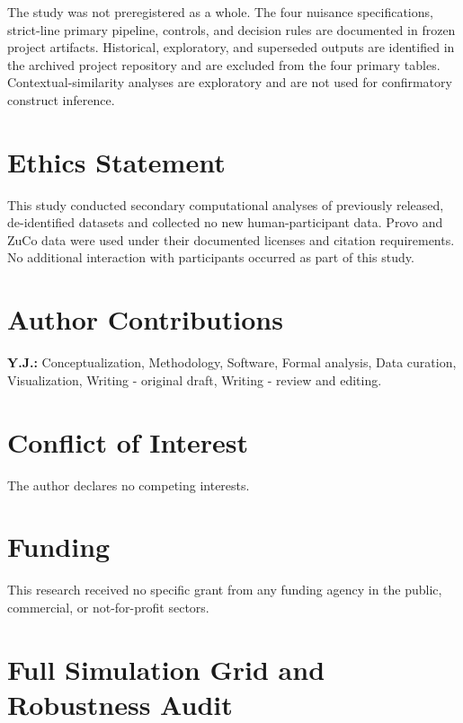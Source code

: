 \documentclass[11pt]{article}
\begin{document}
The study was not preregistered as a whole. The four nuisance specifications, strict-line primary pipeline, controls, and decision rules are documented in frozen project artifacts. Historical, exploratory, and superseded outputs are identified in the archived project repository and are excluded from the four primary tables. Contextual-similarity analyses are exploratory and are not used for confirmatory construct inference.

\section{Ethics Statement}

This study conducted secondary computational analyses of previously released, de-identified datasets and collected no new human-participant data. Provo and ZuCo data were used under their documented licenses and citation requirements. No additional interaction with participants occurred as part of this study.

\section{Author Contributions}

\textbf{Y.J.:} Conceptualization, Methodology, Software, Formal analysis, Data curation, Visualization, Writing - original draft, Writing - review and editing.

\section{Conflict of Interest}

The author declares no competing interests.

\section{Funding}

This research received no specific grant from any funding agency in the public, commercial, or not-for-profit sectors.


\appendix
\section{Full Simulation Grid and Robustness Audit}


\end{document}
